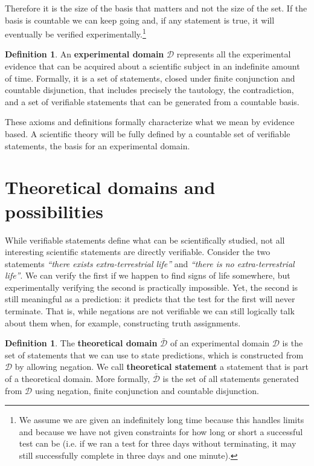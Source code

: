 \documentclass[letterpaper]{article}
\theoremstyle{plain}%
\theoremstyle{definition}
\newtheorem{defn}[thrm]{Definition}
\theoremstyle{remark}
\numberwithin{equation}{section}
\newcommand{\edomain}[1][D] {\mathcal{#1}}
\newcommand{\tdomain}[1][D] {\bar{\mathcal{#1}}}
\newcommand{\statement}[1] {\emph{``#1''}}
\begin{document}
Therefore it is the size of the basis that matters and not the size of the set. If the basis is countable we can keep going and, if any statement is true, it will eventually be verified experimentally.\footnote{We assume we are given an indefinitely long time because this handles limits and because we have not given constraints for how long or short a successful test can be (i.e. if we ran a test for three days without terminating, it may still successfully complete in three days and one minute).}

\begin{defn}
	An \textbf{experimental domain} $\edomain$ represents all the experimental evidence that can be acquired about a scientific subject in an indefinite amount of time. Formally, it is a set of statements, closed under finite conjunction and countable disjunction, that includes precisely the tautology, the contradiction, and a set of verifiable statements that can be generated from a countable basis.
\end{defn}

These axioms and definitions formally characterize what we mean by evidence based. A scientific theory will be fully defined by a countable set of verifiable statements, the basis for an experimental domain.

\section{Theoretical domains and possibilities}

While verifiable statements define what can be scientifically studied, not all interesting scientific statements are directly verifiable. Consider the two statements \statement{there exists extra-terrestrial life} and \statement{there is no extra-terrestrial life}. We can verify the first if we happen to find signs of life somewhere, but experimentally verifying the second is practically impossible. Yet, the second is still meaningful as a prediction: it predicts that the test for the first will never terminate. That is, while negations are not verifiable we can still logically talk about them when, for example, constructing truth assignments.

\begin{defn}
	The \textbf{theoretical domain} $\tdomain$ of an experimental domain $\edomain$ is the set of statements that we can use to state predictions, which is constructed from $\edomain$ by allowing negation. We call \textbf{theoretical statement} a statement that is part of a theoretical domain. More formally, $\tdomain$ is the set of all statements generated from $\edomain$ using negation, finite conjunction and countable disjunction.
\end{defn}
\end{document}
